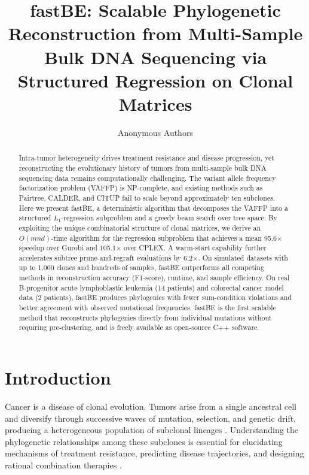 \documentclass[11pt]{article}
\title{fastBE: Scalable Phylogenetic Reconstruction from Multi-Sample Bulk DNA Sequencing via Structured Regression on Clonal Matrices}
\author{Anonymous Authors}
\date{}
\begin{document}
\maketitle

\begin{abstract}
Intra-tumor heterogeneity drives treatment resistance and disease progression, yet reconstructing the evolutionary history of tumors from multi-sample bulk DNA sequencing data remains computationally challenging. The variant allele frequency factorization problem (VAFFP) is NP-complete, and existing methods such as Pairtree, CALDER, and CITUP fail to scale beyond approximately ten subclones. Here we present fastBE, a deterministic algorithm that decomposes the VAFFP into a structured $L_1$-regression subproblem and a greedy beam search over tree space. By exploiting the unique combinatorial structure of clonal matrices, we derive an $O(mnd)$-time algorithm for the regression subproblem that achieves a mean 95.6$\times$ speedup over Gurobi and 105.1$\times$ over CPLEX. A warm-start capability further accelerates subtree prune-and-regraft evaluations by 6.2$\times$. On simulated datasets with up to 1,000 clones and hundreds of samples, fastBE outperforms all competing methods in reconstruction accuracy (F1-score), runtime, and sample efficiency. On real B-progenitor acute lymphoblastic leukemia (14 patients) and colorectal cancer model data (2 patients), fastBE produces phylogenies with fewer sum-condition violations and better agreement with observed mutational frequencies. fastBE is the first scalable method that reconstructs phylogenies directly from individual mutations without requiring pre-clustering, and is freely available as open-source C++ software.
\end{abstract}

\section{Introduction}

Cancer is a disease of clonal evolution. Tumors arise from a single ancestral cell and diversify through successive waves of mutation, selection, and genetic drift, producing a heterogeneous population of subclonal lineages \citep{nowell2017clonal, swanton2012intratumor}. Understanding the phylogenetic relationships among these subclones is essential for elucidating mechanisms of treatment resistance, predicting disease trajectories, and designing rational combination therapies \citep{mcgranahan2015clonal, turajlic2019resolving}.
\end{document}

